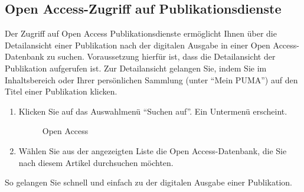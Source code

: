\subsection{Open Access-Zugriff auf Publikationsdienste}%
Der Zugriff auf Open Access Publikationsdienste ermöglicht Ihnen über die Detailansicht einer Publikation nach der digitalen Ausgabe in einer Open Access-Datenbank zu suchen. Voraussetzung hierfür ist, dass die Detailansicht der Publikation aufgerufen ist. Zur Detailansicht gelangen Sie, indem Sie im Inhaltsbereich oder Ihrer persönlichen Sammlung (unter \enquote{Mein PUMA}) auf den Titel einer Publikation klicken. 
\begin{enumerate}
    \item Klicken Sie auf das Auswahlmenü \enquote{Suchen auf}. Ein Untermenü erscheint.
\begin{figure}[h!]
 \centering
 \caption{Open Access}
 \label{figure033}
\end{figure}
    \item Wählen Sie aus der angezeigten Liste die Open Access-Datenbank, die Sie nach diesem Artikel durchsuchen möchten. 
\end{enumerate}
 So gelangen Sie schnell und einfach zu der digitalen Ausgabe einer Publikation. 
